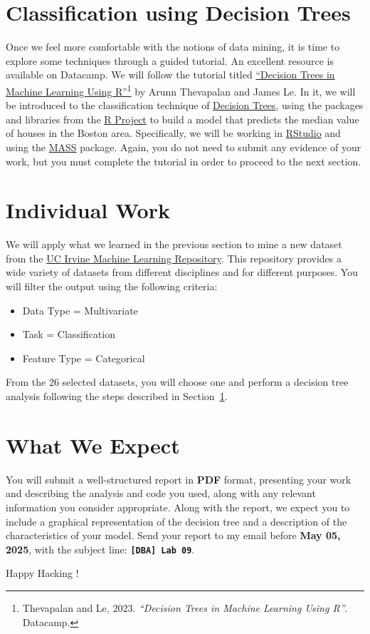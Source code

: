 \documentclass{article}
\begin{document}
\section{Classification using Decision Trees}\label{sec:tree}
Once we feel more comfortable with the notions of data mining, it is time to explore some techniques through a guided tutorial. An excellent resource is available on Datacamp. We will follow the tutorial titled \href{https://www.datacamp.com/tutorial/decision-trees-R}{``Decision Trees in Machine Learning Using R''}\footnote{Thevapalan and Le, 2023. \textit{``Decision Trees in Machine Learning Using R''}. Datacamp.} by Arunn Thevapalan and James Le. In it, we will be introduced to the classification technique of \href{https://en.wikipedia.org/wiki/Decision_tree}{Decision Trees}, using the packages and libraries from the \href{https://www.r-project.org/}{R Project} to build a model that predicts the median value of houses in the Boston area. Specifically, we will be working in \href{https://posit.co/download/rstudio-desktop/}{RStudio} and using the \href{https://cran.r-project.org/web/packages/MASS/index.html}{MASS} package. Again, you do not need to submit any evidence of your work, but you must complete the tutorial in order to proceed to the next section.

\section{Individual Work}
We will apply what we learned in the previous section to mine a new dataset from the \href{https://archive.ics.uci.edu/datasets}{UC Irvine Machine Learning Repository}. This repository provides a wide variety of datasets from different disciplines and for different purposes. You will filter the output using the following criteria:

\begin{itemize}
    \item Data Type = Multivariate
    \item Task = Classification
    \item Feature Type = Categorical
\end{itemize}

From the 26 selected datasets, you will choose one and perform a decision tree analysis following the steps described in Section~\ref{sec:tree}.

\section{What We Expect}
You will submit a well-structured report in \textbf{PDF} format, presenting your work and describing the analysis and code you used, along with any relevant information you consider appropriate. Along with the report, we expect you to include a graphical representation of the decision tree and a description of the characteristics of your model. Send your report to my email before \textbf{May 05, 2025}, with the subject line: {\LARGE \textbf{\texttt{[DBA] Lab 09}}}.

\vspace{5mm}
Happy Hacking !
\end{document}
